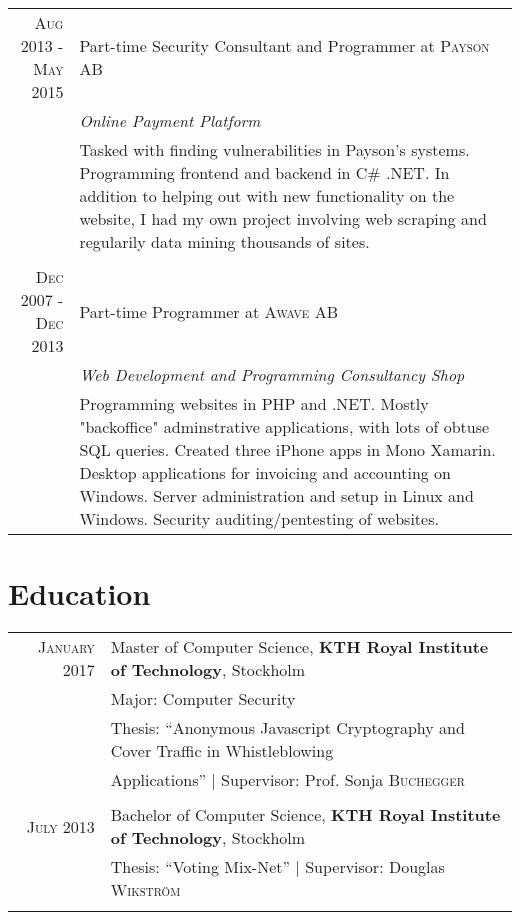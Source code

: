 \documentclass[a4paper,10pt]{article}
\begin{document}
\begin{tabular}{r|p{11cm}}
\textsc{Aug 2013 - May 2015} & Part-time Security Consultant and Programmer at \textsc{Payson AB}\\
&\emph{Online Payment Platform}
\\&\footnotesize{Tasked with finding vulnerabilities in Payson's systems. Programming frontend and backend in C\# .NET. In addition to helping out with new functionality on the website, I had my own project involving web scraping and regularily data mining thousands of sites. }\\\multicolumn{2}{c}{} \\

\textsc{Dec 2007 - Dec 2013} & Part-time Programmer at \textsc{Awave AB}\\
&\emph{Web Development and Programming Consultancy Shop}
\\&\footnotesize{
Programming websites in PHP and .NET. Mostly "backoffice" adminstrative applications, with lots of obtuse SQL queries. Created three iPhone apps in Mono Xamarin. Desktop applications for invoicing and accounting on Windows. Server administration and setup in Linux and Windows. Security auditing/pentesting of websites. }


\end{tabular}

\section{Education}
\begin{tabular}{rl}	
 \textsc{January} 2017 & Master of Computer Science, \textbf{KTH Royal Institute of Technology}, Stockholm\\
&Major: Computer Security\\
& Thesis: ``Anonymous Javascript Cryptography and Cover Traffic in Whistleblowing\\& Applications'' | \small Supervisor: Prof. Sonja \textsc{Buchegger}\\ \\

\textsc{July} 2013 & Bachelor of Computer Science, \textbf{KTH Royal Institute of Technology}, Stockholm\\
& Thesis: ``Voting Mix-Net'' | \small Supervisor: Douglas \textsc{Wikström}\\ \\
\end{tabular}
\end{document}
